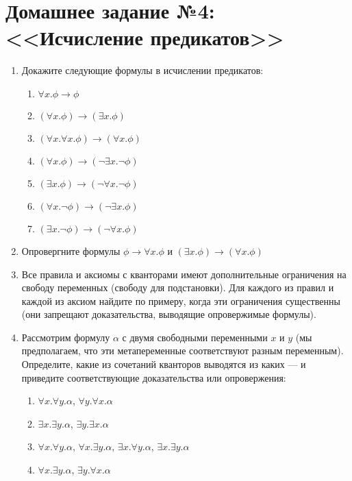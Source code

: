 \documentclass[10pt,a4paper,oneside]{article}
\begin{document}
\section*{Домашнее задание №4: <<Исчисление предикатов>>}
\begin{enumerate}
\item Докажите следующие формулы в исчислении предикатов:
\begin{enumerate}
\item $\forall x.\phi\rightarrow \phi$
\item $(\forall x.\phi)\rightarrow (\exists x.\phi)$
\item $(\forall x.\forall x.\phi) \rightarrow (\forall x.\phi)$
\item $(\forall x.\phi) \rightarrow (\neg \exists x.\neg \phi)$ 
\item $(\exists x.\phi) \rightarrow (\neg \forall x.\neg \phi)$
\item $(\forall x.\neg\phi) \rightarrow (\neg \exists x.\phi)$ 
\item $(\exists x.\neg\phi) \rightarrow (\neg \forall x.\phi)$
\end{enumerate}

\item Опровергните формулы $\phi\rightarrow\forall x. \phi$ и $(\exists x.\phi)\rightarrow (\forall x.\phi)$

\item Все правила и аксиомы с кванторами имеют дополнительные ограничения
на свободу переменных (свободу для подстановки). Для каждого из правил и 
каждой из аксиом найдите по примеру, когда эти ограничения существенны 
(они запрещают доказательства, выводящие опровержимые формулы).

\item Рассмотрим формулу $\alpha$ с двумя свободными переменными $x$ и $y$ (мы предполагаем,
что эти метапеременные соответствуют разным переменным).
Определите, какие из сочетаний кванторов выводятся из каких --- и приведите соответствующие
доказательства или опровержения:
\begin{enumerate}
\item $\forall x.\forall y.\alpha$, $\forall y.\forall x.\alpha$
\item $\exists x.\exists y.\alpha$, $\exists y.\exists x.\alpha$
\item $\forall x.\forall y.\alpha$, $\forall x.\exists y.\alpha$, $\exists x.\forall y.\alpha$, $\exists x.\exists y.\alpha$
\item $\forall x.\exists y.\alpha$, $\exists y.\forall x.\alpha$
\end{enumerate}


\end{enumerate}
\end{document}
